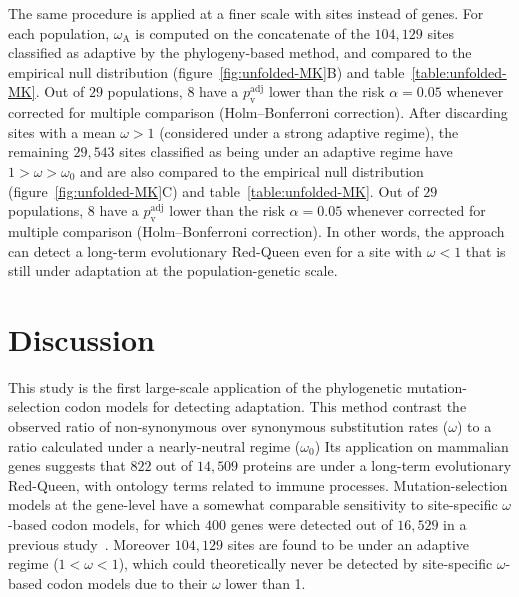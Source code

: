 \documentclass{article}
\begin{document}
    The same procedure is applied at a finer scale with sites instead of genes.
    For each population, $\omega_{\mathrm{A}}$ is computed on the concatenate of the $104,129$ sites classified as adaptive by the phylogeny-based method, and compared to the empirical null distribution (figure~\ref{fig:unfolded-MK}B) and table~\ref{table:unfolded-MK}.
    Out of $29$ populations, $8$ have a $p_{\mathrm{v}}^{\mathrm{adj}}$ lower than the risk $\alpha=0.05$ whenever corrected for multiple comparison (Holm–Bonferroni correction).
    After discarding sites with a mean $\omega > 1$ (considered under a strong adaptive regime), the remaining $29,543$ sites classified as being under an adaptive regime have $1 > \omega > \omega_{0}$ and are also compared to the empirical null distribution (figure~\ref{fig:unfolded-MK}C) and table~\ref{table:unfolded-MK}.
    Out of $29$ populations, $8$ have a $p_{\mathrm{v}}^{\mathrm{adj}}$ lower than the risk $\alpha=0.05$ whenever corrected for multiple comparison (Holm–Bonferroni correction).
    In other words, the approach can detect a long-term evolutionary Red-Queen even for a site with $\omega < 1$ that is still under adaptation at the population-genetic scale.

    \section*{Discussion}\label{sec:discussion}

    This study is the first large-scale application of the phylogenetic mutation-selection codon models for detecting adaptation.
    This method contrast the observed ratio of non-synonymous over synonymous substitution rates ($\omega$) to a ratio calculated under a nearly-neutral regime ($\omega_{0}$)
    Its application on mammalian genes suggests that $822$ out of $14,509$ proteins are under a long-term evolutionary Red-Queen, with ontology terms related to immune processes.
    Mutation-selection models at the gene-level have a somewhat comparable sensitivity to site-specific $\omega$-based codon models, for which $400$ genes were detected out of $16,529$ in a previous study~\cite{kosiol_patterns_2008}.
    Moreover $104,129$ sites are found to be under an adaptive regime ($1 < \omega < 1$), which could theoretically never be detected by site-specific $\omega$-based codon models due to their $\omega$ lower than 1.
\end{document}
